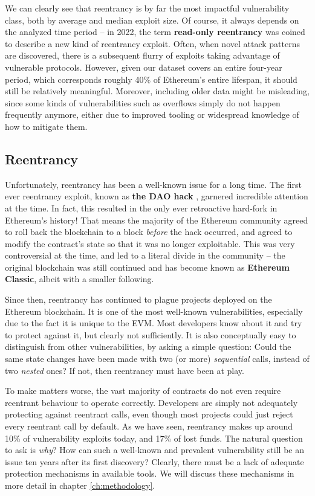 We can clearly see that reentrancy is by far the most impactful vulnerability class, both by average and median exploit size. Of course, it always depends on the analyzed time period -- in 2022, the term \textbf{read-only reentrancy} was coined \cite{readonly-reentrancy} to describe a new kind of reentrancy exploit. Often, when novel attack patterns are discovered, there is a subsequent flurry of exploits taking advantage of vulnerable protocols. However, given our dataset covers an entire four-year period, which corresponds roughly 40\% of Ethereum's entire lifespan, it should still be relatively meaningful. Moreover, including older data might be misleading, since some kinds of vulnerabilities such as overflows simply do not happen frequently anymore, either due to improved tooling or widespread knowledge of how to mitigate them.

\subsection{Reentrancy}
Unfortunately, reentrancy has been a well-known issue for a long time. The first ever reentrancy exploit, known as \textbf{the DAO hack} \cite{dao-hack}, garnered incredible attention at the time. In fact, this resulted in the only ever retroactive hard-fork in Ethereum's history! That means the majority of the Ethereum community agreed to roll back the blockchain to a block \textit{before} the hack occurred, and agreed to modify the contract's state so that it was no longer exploitable. This was very controversial at the time, and led to a literal divide in the community -- the original blockchain was still continued and has become known as \textbf{Ethereum Classic}, albeit with a smaller following.
\par
Since then, reentrancy has continued to plague projects deployed on the Ethereum blockchain. It is one of the most well-known vulnerabilities, especially due to the fact it is unique to the EVM. Most developers know about it and try to protect against it, but clearly not sufficiently. It is also conceptually easy to distinguish from other vulnerabilities, by asking a simple question: Could the same state changes have been made with two (or more) \textit{sequential} calls, instead of two \textit{nested} ones? If not, then reentrancy must have been at play.
\par
To make matters worse, the vast majority of contracts do not even require reentrant behaviour to operate correctly. Developers are simply not adequately protecting against reentrant calls, even though most projects could just reject every reentrant call by default. As we have seen, reentrancy makes up around 10\% of vulnerability exploits today, and 17\% of lost funds. The natural question to ask is \textit{why}? How can such a well-known and prevalent vulnerability still be an issue ten years after its first discovery? Clearly, there must be a lack of adequate protection mechanisms in available tools. We will discuss these mechanisms in more detail in chapter \ref{ch:methodology}.

